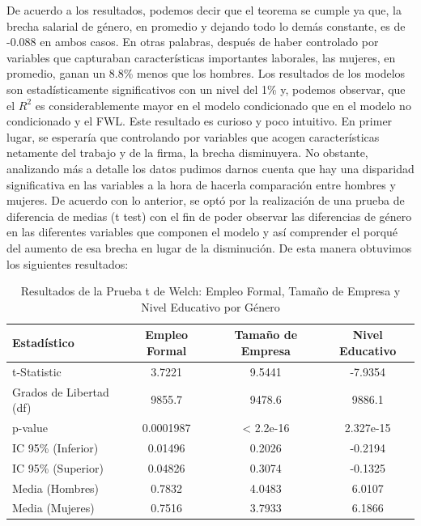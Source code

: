 \documentclass[10pt]{article}
\begin{document}
De acuerdo a los resultados, podemos decir que el teorema se cumple ya que, la brecha salarial de género, en promedio y dejando todo lo demás constante, es de -0.088 en ambos casos. En otras palabras, después de haber controlado por variables que capturaban características importantes laborales, las mujeres, en promedio, ganan un 8.8\% menos que los hombres. Los resultados de los modelos son estadísticamente significativos con un nivel del 1\% y, podemos observar, que el \( R^2 \) es considerablemente mayor en el modelo condicionado que en el modelo no condicionado y el FWL. Este resultado es curioso y poco intuitivo. En primer lugar, se esperaría que controlando por variables que acogen características netamente del trabajo y de la firma, la brecha disminuyera. No obstante, analizando más a detalle los datos pudimos darnos cuenta que hay una disparidad significativa en las variables a la hora de hacerla comparación entre hombres y mujeres. De acuerdo con lo anterior, se optó por la realización de una prueba de diferencia de medias (t test) con el fin de poder observar las diferencias de género en las diferentes variables que componen el modelo y así comprender el porqué del aumento de esa brecha en lugar de la disminución. De esta manera obtuvimos los siguientes resultados: 

\begin{table}[htbp]
    \centering
    \caption{Resultados de la Prueba t de Welch: Empleo Formal, Tamaño de Empresa y Nivel Educativo por Género}
    \label{tab:t_test_formal_size_education}
    \begin{tabular}{lccc}
        \hline
        Estadístico & Empleo Formal & Tamaño de Empresa & Nivel Educativo \\ 
        \hline
        t-Statistic & 3.7221 & 9.5441 & -7.9354 \\ 
        Grados de Libertad (df) & 9855.7 & 9478.6 & 9886.1 \\ 
        p-value & 0.0001987 & < 2.2e-16 & 2.327e-15 \\ 
        IC 95\% (Inferior) & 0.01496 & 0.2026 & -0.2194 \\ 
        IC 95\% (Superior) & 0.04826 & 0.3074 & -0.1325 \\ 
        Media (Hombres) & 0.7832 & 4.0483 & 6.0107 \\ 
        Media (Mujeres) & 0.7516 & 3.7933 & 6.1866 \\ 
        \hline
    \end{tabular}
\end{table}
\end{document}
